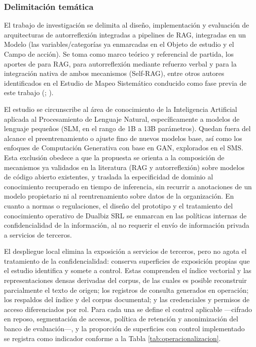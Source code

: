 \subsubsection*{Delimitación temática}

El trabajo de investigación se delimita al diseño, implementación y evaluación de arquitecturas de autorreflexión integradas a pipelines de RAG, integradas en un Modelo (las variables/categorías ya enmarcadas en el Objeto de estudio y el Campo de acción). Se toma como marco teórico y referencial de partida, los aportes de \textcite{Lewis2020rag} para RAG, \textcite{Shinn2023_Reflexion} para autorreflexión mediante refuerzo verbal y \textcite{Asai2024_Selfrag} para la integración nativa de ambos mecanismos (Self-RAG), entre otros autores identificados en el Estudio de Mapeo Sistemático conducido como fase previa de este trabajo (\cite{Kitchenham2007guidelines}; \cite{Petersen2008systematic}).

El estudio se circunscribe al área de conocimiento de la Inteligencia Artificial aplicada al Procesamiento de Lenguaje Natural, específicamente a modelos de lenguaje pequeños (SLM, en el rango de 1B a 13B parámetros). Quedan fuera del alcance el preentrenamiento o ajuste fino de nuevos modelos base, así como los enfoques de Computación Generativa con base en GAN, explorados en el SMS. Esta exclusión obedece a que la propuesta se orienta a la composición de mecanismos ya validados en la literatura (RAG y autorreflexión) sobre modelos de código abierto existentes, y traslada la especificidad de dominio al conocimiento recuperado en tiempo de inferencia, sin recurrir a anotaciones de un modelo propietario ni al reentrenamiento sobre datos de la organización. En cuanto a normas o regulaciones, el diseño del prototipo y el tratamiento del conocimiento operativo de Dualbiz SRL se enmarcan en las políticas internas de confidencialidad de la información, al no requerir el envío de información privada a servicios de terceros.

El despliegue local elimina la exposición a servicios de terceros, pero no agota el tratamiento de la confidencialidad: conserva superficies de exposición propias que el estudio identifica y somete a control. Estas comprenden el índice vectorial y las representaciones densas derivadas del corpus, de las cuales es posible reconstruir parcialmente el texto de origen; los registros de consulta generados en operación; los respaldos del índice y del corpus documental; y las credenciales y permisos de acceso diferenciados por rol. Para cada una se define el control aplicable ---cifrado en reposo, segmentación de accesos, política de retención y anonimización del banco de evaluación---, y la proporción de superficies con control implementado se registra como indicador conforme a la Tabla \ref{tab:operacionalizacion}.

